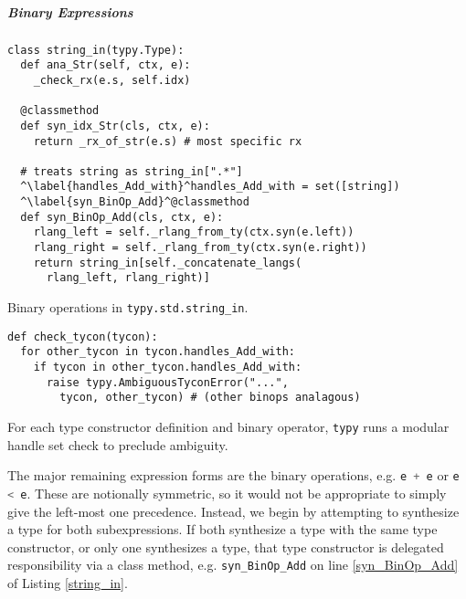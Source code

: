 \documentclass{sigplanconf}
\newcommand{\lip}[1]{\lstinline[language=Python,basicstyle=\ttfamily\small,deletendkeywords={tuple,buffer,map}]{#1}}
\begin{document}
\subparagraph{Binary Expressions} \begin{codelisting}[t]
\begin{lstlisting}
class string_in(typy.Type):
  def ana_Str(self, ctx, e):
    _check_rx(e.s, self.idx)

  @classmethod
  def syn_idx_Str(cls, ctx, e):
    return _rx_of_str(e.s) # most specific rx

  # treats string as string_in[".*"]
  ^\label{handles_Add_with}^handles_Add_with = set([string]) 
  ^\label{syn_BinOp_Add}^@classmethod
  def syn_BinOp_Add(cls, ctx, e): 
    rlang_left = self._rlang_from_ty(ctx.syn(e.left)) 
    rlang_right = self._rlang_from_ty(ctx.syn(e.right))
    return string_in[self._concatenate_langs(
      rlang_left, rlang_right)]
\end{lstlisting}
\caption{Binary operations in \texttt{typy.std.string\_in}.}
\label{string_in}
\end{codelisting}
\begin{codelisting}[t]
\begin{lstlisting}
def check_tycon(tycon):
  for other_tycon in tycon.handles_Add_with: 
    if tycon in other_tycon.handles_Add_with:
      raise typy.AmbiguousTyconError("...", 
        tycon, other_tycon) # (other binops analagous)
\end{lstlisting}
\caption{For each type constructor definition and binary operator, \texttt{typy} runs a modular handle set check to preclude ambiguity.}
\label{check_tycon}
\end{codelisting}
The major remaining expression forms are the binary operations, e.g. \lip{e + e} or \lip{e < e}. These are notionally symmetric, so it would not be appropriate to simply give the left-most one precedence. Instead, we begin by attempting to synthesize a type for both subexpressions. If both synthesize a type with the same type constructor, or only one synthesizes a type, that type constructor is delegated responsibility via a class method, e.g. \lip{syn_BinOp_Add} on line \ref{syn_BinOp_Add} of Listing \ref{string_in}. 
\end{document}
